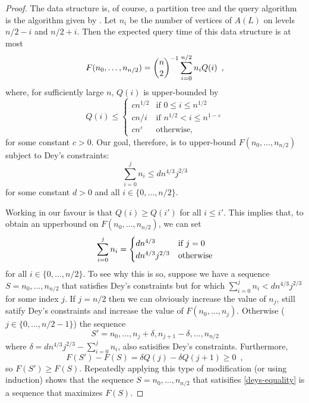 \documentclass{cccg12}
\newcommand{\eps}{\varepsilon}
\begin{document}
\begin{proof}
  The data structure is, of course, a partition tree and the query
  algorithm is the algorithm given by .  Let $n_i$
  be the number of vertices of $A(L)$ on levels $n/2-i$ and $n/2+i$.
  Then the expected query time of this data structure is at most
  \begin{equation}
    F(n_0,\ldots,n_{n/2}) 
      = \binom{n}{2}^{-1}\sum_{i=0}^{n/2} n_i Q(i) \enspace ,
     \eqlabel{expected}
  \end{equation}
  where, for sufficiently large $n$, $Q(i)$ is upper-bounded by
  \[
        Q(i) \le \begin{cases}
          cn^{1/2} & \text{if $0\le i \le n^{1/2}$} \\
          cn/i      & \text{if $n^{1/2} < i \le n^{1-\eps}$} \\
          cn^{\eps} & \text{otherwise,}
        \end{cases}
  \]
  for some constant $c>0$.   Our goal, therefore, is to
  upper-bound $F(n_0,\ldots,n_{n/2})$ subject to Dey's constraints:
  \[
     \sum_{i=0}^{j}n_i \le dn^{4/3}j^{2/3} 
  \]
  for some constant $d>0$ and all $i\in\{0,\ldots,n/2\}$.

  Working in our favour is that $Q(i) \ge Q(i')$ for all $i \le i'$.
  This implies that, to obtain an upperbound on $F(n_0,\ldots,n_{n/2})$,
  we can set
  \begin{equation}
      \sum_{i=0}^{j}n_i = 
        \begin{cases}
           dn^{4/3} & \text{if $j=0$} \\
           dn^{4/3}j^{2/3} & \text{otherwise}
        \end{cases}  \eqlabel{deys-equality}
  \end{equation}
  for all $i\in\{0,\ldots,n/2\}$.  To see why this is so, suppose we have
  a sequence $S=n_0,\ldots,n_{n/2}$ that satisfies Dey's constraints
  but for which $\sum_{i=0}^{j}n_i < dn^{4/3}j^{2/3}$ for some index
  $j$. If $j=n/2$ then we can obviously increase the value of $n_j$, still
  satify Dey's constraints and increase the value of $F(n_0,\ldots,n_j)$.
  Otherwise ($j\in\{0,\ldots,n/2-1\}$) the sequence
  \[
     S'=n_0,\ldots,n_{j}+\delta,n_{j+1}-\delta,\ldots,n_{n/2}
  \]
  where $\delta=dn^{4/3}j^{2/3}-\sum_{i=0}^{j}n_i$, also satisifies
  Dey's constraints.  Furthermore, 
  \[  
     F(S')-F(S) = \delta Q(j) - \delta Q(j+1) \ge 0 \enspace , 
  \]
  so $F(S')\ge F(S)$.  Repeatedly applying this type of modification (or
  using induction) shows that the sequence $S=n_0,\ldots,n_{n/2}$ that
  satisifies \eqref{deys-equality} is a sequence that maximizes $F(S)$.


\end{proof}
\end{document}
